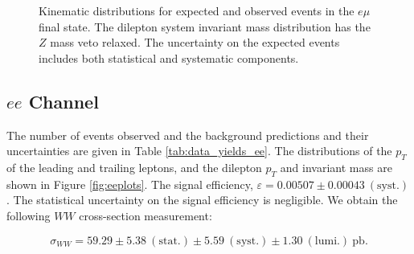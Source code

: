 \begin{figure}[!hbtp]
\begin{center}
\caption{Kinematic distributions for expected and observed events in the $e\mu$ final state.
The dilepton system invariant mass distribution has the $Z$ mass veto relaxed.
The uncertainty on the expected events includes both statistical and systematic components.}
\label{fig:emplots}
\end{center}
\end{figure}

%
%
%
\clearpage
\subsection{$ee$ Channel}

The number of events observed and the background predictions and their uncertainties are
given in Table \ref{tab:data_yields_ee}.
The distributions of the $p_{T}$ of the leading and trailing leptons, and the dilepton $p_{T}$
and invariant mass are shown in Figure \ref{fig:eeplots}.
The signal efficiency,  $\varepsilon = 0.00507 \pm 0.00043~\mathrm{(syst.)}$.
The statistical uncertainty on the signal efficiency is negligible.
We obtain the following $WW$ cross-section measurement:

\begin{equation*}
\sigma_{WW}  = 59.29 \pm 5.38~\mathrm{(stat.)} \pm 5.59~\mathrm{(syst.)} \pm 1.30~\mathrm{(lumi.)~pb}.
\end{equation*}

